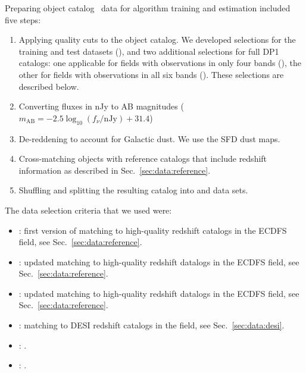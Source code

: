 Preparing object catalog~\citep{10.71929/rubin/2570325} data for \photoz algorithm training and estimation included five steps:

\begin{enumerate}
\item{Applying quality cuts to the object catalog.   We developed selections for the training and test datasets (), and two additional selections for full DP1 catalogs: one applicable for fields with observations in only four bands (), the other for fields with observations in all six bands ().  These selections are described below.}
\item{Converting fluxes in nJy to AB magnitudes ($m_\text{AB} = -2.5 \log_{10}(f_\nu / \text{nJy}) + 31.4$)}
\item{De-reddening to account for Galactic dust.  We use the SFD dust maps\citep{SFD}.}
\item{Cross-matching objects with reference catalogs that include redshift information as described in Sec.~\ref{sec:data:reference}.}
\item{Shuffling and splitting the resulting catalog into  and  data sets.}
\end{enumerate}

The data selection criteria that we used were:
\begin{itemize}
\item{: first version of matching to high-quality redshift catalogs in the ECDFS field,  see Sec.~\ref{sec:data:reference}.}
\item{: updated matching to high-quality redshift datalogs in the ECDFS field, see Sec.~\ref{sec:data:reference}.}
\item{: updated matching to high-quality redshift datalogs in the ECDFS field, see Sec.~\ref{sec:data:reference}.}  
\item{: matching to DESI redshift catalogs in the  field, see Sec.~\ref{sec:data:desi}.}
\item{: .}
\item{: .}
\end{itemize}

